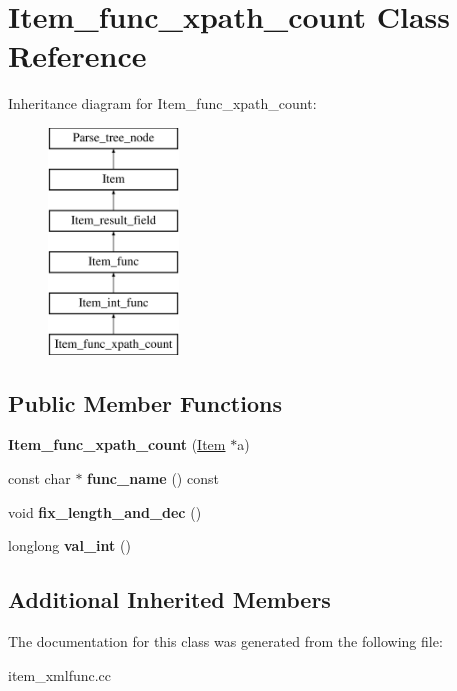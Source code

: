\hypertarget{classItem__func__xpath__count}{}\section{Item\+\_\+func\+\_\+xpath\+\_\+count Class Reference}
\label{classItem__func__xpath__count}
Inheritance diagram for Item\+\_\+func\+\_\+xpath\+\_\+count\+:\begin{figure}[H]
\begin{center}
\leavevmode
\includegraphics[height=6.000000cm]{classItem__func__xpath__count}
\end{center}
\end{figure}
\subsection*{Public Member Functions}
\begin{DoxyCompactItemize}
\item 
\mbox{\label{classItem__func__xpath__count_ad87de25a3845ee34b1d662d8d40b1159}} 
{\bfseries Item\+\_\+func\+\_\+xpath\+\_\+count} (\mbox{\hyperlink{classItem}{Item}} $\ast$a)
\item 
\mbox{\label{classItem__func__xpath__count_ac1d52a33eb10bd71daac69e8f086e651}} 
const char $\ast$ {\bfseries func\+\_\+name} () const
\item 
\mbox{\label{classItem__func__xpath__count_a42c1b8b014db9c044f4521725d47ed8b}} 
void {\bfseries fix\+\_\+length\+\_\+and\+\_\+dec} ()
\item 
\mbox{\label{classItem__func__xpath__count_abb73440ee854c9f079b19960a6f315f8}} 
longlong {\bfseries val\+\_\+int} ()
\end{DoxyCompactItemize}
\subsection*{Additional Inherited Members}


The documentation for this class was generated from the following file\+:\begin{DoxyCompactItemize}
\item 
item\+\_\+xmlfunc.\+cc\end{DoxyCompactItemize}
